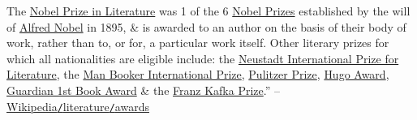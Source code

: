 \documentclass[oneside]{book}
\numberwithin{equation}{section}
\begin{document}
The \href{https://en.wikipedia.org/wiki/Nobel_Prize_in_Literature}{Nobel Prize in Literature} was 1 of the 6 \href{https://en.wikipedia.org/wiki/Nobel_Prizes}{Nobel Prizes} established by the will of \href{https://en.wikipedia.org/wiki/Alfred_Nobel}{Alfred Nobel} in 1895, \& is awarded to an author on the basis of their body of work, rather than to, or for, a particular work itself. Other literary prizes for which all nationalities are eligible include: the \href{https://en.wikipedia.org/wiki/Neustadt_International_Prize_for_Literature}{Neustadt International Prize for Literature}, the \href{https://en.wikipedia.org/wiki/Man_Booker_International_Prize}{Man Booker International Prize}, \href{https://en.wikipedia.org/wiki/Pulitzer_Prize_for_Drama}{Pulitzer Prize}, \href{https://en.wikipedia.org/wiki/Hugo_Award_for_Best_Novel}{Hugo Award}, \href{https://en.wikipedia.org/wiki/Guardian_First_Book_Award}{Guardian 1st Book Award} \& the \href{https://en.wikipedia.org/wiki/Franz_Kafka_Prize}{Franz Kafka Prize}.'' -- \href{https://en.wikipedia.org/wiki/Literature#Awards}{Wikipedia\texttt{/}literature\texttt{/}awards}

\end{document}
